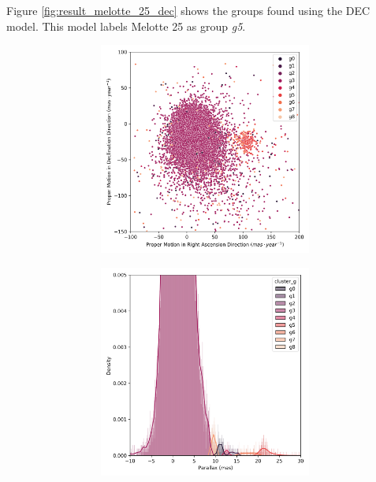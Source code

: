 \documentclass[11pt,a4paper,english,twocolumn]{article}
\begin{document}
Figure \ref{fig:result_melotte_25_dec} shows the groups found using the DEC model.
This model labels Melotte 25 as group \emph{g5}.

\begin{figure}[htbp]
  \centering
  \begin{subfigure}{\columnwidth}
    \centering
    \begin{subfigure}[t]{0.30\textwidth}
      \centering
      \includegraphics[width=\textwidth]{../figures/melotte_25/dec_pm_melotte_25.png}
    \end{subfigure}
    \hfill
    \begin{subfigure}[t]{0.30\textwidth}
      \centering
      \includegraphics[width=\textwidth]{../figures/melotte_25/dec_parallax_melotte_25.png}

\end{subfigure}
\end{subfigure}
\end{figure}
\end{document}
